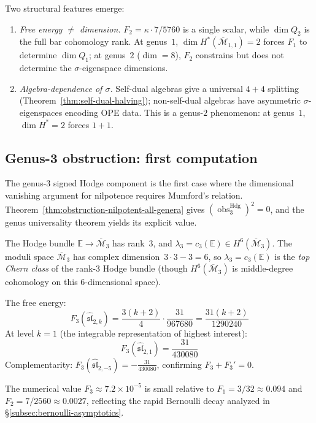 \begin{remark}%
\label{rem:genus2-complementarity-reveals}
Two structural features emerge:
\begin{enumerate}
\item \emph{Free energy $\neq$ dimension.} $F_2 = \kappa \cdot 7/5760$ is a single scalar, while $\dim Q_2$ is the full bar cohomology rank. At genus~$1$, $\dim H^*(\overline{\mathcal{M}}_{1,1}) = 2$ forces $F_1$ to determine $\dim Q_1$; at genus~$2$ ($\dim = 8$), $F_2$ constrains but does not determine the $\sigma$-eigenspace dimensions.
\item \emph{Algebra-dependence of $\sigma$.} Self-dual algebras give a universal $4+4$ splitting (Theorem~\ref{thm:self-dual-halving}); non-self-dual algebras have asymmetric $\sigma$-eigenspaces encoding OPE data. This is a genus-$2$ phenomenon: at genus~$1$, $\dim H^* = 2$ forces $1+1$.
\end{enumerate}
\end{remark}

\subsection{Genus-3 obstruction: first computation}\label{subsec:genus-3}

\begin{computation}\label{comp:genus-3-sl2}
The genus-$3$ signed Hodge component is the first case where the
dimensional vanishing argument for nilpotence requires Mumford's
relation.  Theorem~\ref{thm:obstruction-nilpotent-all-genera} gives
$(\operatorname{obs}^{\mathrm{Hdg}}_3)^2=0$, and the genus
universality theorem yields its explicit value.

The Hodge bundle $\mathbb{E} \to \overline{\mathcal{M}}_3$ has rank~$3$, and $\lambda_3 = c_3(\mathbb{E}) \in H^6(\overline{\mathcal{M}}_3)$. The moduli space $\overline{\mathcal{M}}_3$ has complex dimension~$3 \cdot 3 - 3 = 6$, so $\lambda_3 = c_3(\mathbb{E})$ is the \emph{top Chern class} of the rank-$3$ Hodge bundle (though $H^6(\overline{\mathcal{M}}_3)$ is middle-degree cohomology on this $6$-dimensional space).

The free energy:
\[
F_3(\widehat{\mathfrak{sl}}_{2,k}) = \frac{3(k+2)}{4} \cdot \frac{31}{967680}
= \frac{31(k+2)}{1290240}
\]
At level $k = 1$ (the integrable representation of highest interest):
\begin{equation}\label{eq:genus3-k1}
F_3(\widehat{\mathfrak{sl}}_{2,1}) = \frac{31}{430080}
\end{equation}
Complementarity: $F_3(\widehat{\mathfrak{sl}}_{2,-5}) = -\frac{31}{430080}$, confirming $F_3 + F_3' = 0$.

The numerical value $F_3 \approx 7.2 \times 10^{-5}$ is small relative to $F_1 = 3/32 \approx 0.094$ and $F_2 = 7/2560 \approx 0.0027$, reflecting the rapid Bernoulli decay analyzed in \S\ref{subsec:bernoulli-asymptotics}.
\end{computation}

